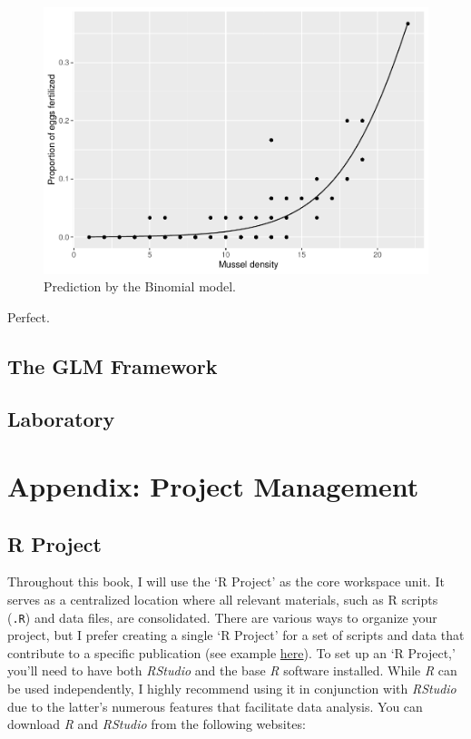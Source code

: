 \documentclass[
]{book}
\begin{document}
\begin{figure}

{\centering \includegraphics{biostats_files/figure-latex/binom-fit-figure-1} 

}

\caption{Prediction by the Binomial model.}\label{fig:binom-fit-figure}
\end{figure}

Perfect.

\hypertarget{the-glm-framework}{%
\section{The GLM Framework}\label{the-glm-framework}}

\hypertarget{laboratory-7}{%
\section{Laboratory}\label{laboratory-7}}

\hypertarget{appendix-project-management}{%
\chapter{Appendix: Project Management}\label{appendix-project-management}}

\hypertarget{r-project}{%
\section{R Project}\label{r-project}}

Throughout this book, I will use the `R Project' as the core workspace unit. It serves as a centralized location where all relevant materials, such as R scripts (\texttt{.R}) and data files, are consolidated. There are various ways to organize your project, but I prefer creating a single `R Project' for a set of scripts and data that contribute to a specific publication (see example \href{https://github.com/aterui/public-proj_stream-diversity}{here}). To set up an `R Project,' you'll need to have both \emph{RStudio} and the base \emph{R} software installed. While \emph{R} can be used independently, I highly recommend using it in conjunction with \emph{RStudio} due to the latter's numerous features that facilitate data analysis. You can download \emph{R} and \emph{RStudio} from the following websites:
\end{document}
